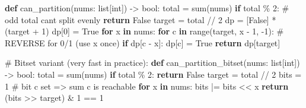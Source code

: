 \documentclass[11pt]{article}
\newenvironment{Shaded}{\begin{snugshade}}{\end{snugshade}}
\newcommand{\BuiltInTok}[1]{\textcolor[rgb]{0.50,0.55,0.55}{#1}}
\newcommand{\CommentTok}[1]{\textcolor[rgb]{0.48,0.49,0.49}{#1}}
\newcommand{\ControlFlowTok}[1]{\textcolor[rgb]{0.99,0.74,0.29}{\textbf{#1}}}
\newcommand{\DecValTok}[1]{\textcolor[rgb]{0.96,0.45,0.00}{#1}}
\newcommand{\KeywordTok}[1]{\textcolor[rgb]{0.81,0.81,0.76}{\textbf{#1}}}
\newcommand{\NormalTok}[1]{\textcolor[rgb]{0.81,0.81,0.76}{#1}}
\newcommand{\OperatorTok}[1]{\textcolor[rgb]{0.81,0.81,0.76}{#1}}
\newcommand{\VariableTok}[1]{\textcolor[rgb]{0.15,0.68,0.68}{#1}}
\begin{document}
\begin{Shaded}
\begin{Highlighting}[]
\KeywordTok{def}\NormalTok{ can\_partition(nums: }\BuiltInTok{list}\NormalTok{[}\BuiltInTok{int}\NormalTok{]) }\OperatorTok{{-}\textgreater{}} \BuiltInTok{bool}\NormalTok{:}
\NormalTok{    total }\OperatorTok{=} \BuiltInTok{sum}\NormalTok{(nums)}
    \ControlFlowTok{if}\NormalTok{ total }\OperatorTok{\%} \DecValTok{2}\NormalTok{:                 }\CommentTok{\# odd total can\textquotesingle{}t split evenly}
        \ControlFlowTok{return} \VariableTok{False}
\NormalTok{    target }\OperatorTok{=}\NormalTok{ total }\OperatorTok{//} \DecValTok{2}
\NormalTok{    dp }\OperatorTok{=}\NormalTok{ [}\VariableTok{False}\NormalTok{] }\OperatorTok{*}\NormalTok{ (target }\OperatorTok{+} \DecValTok{1}\NormalTok{)}
\NormalTok{    dp[}\DecValTok{0}\NormalTok{] }\OperatorTok{=} \VariableTok{True}
    \ControlFlowTok{for}\NormalTok{ x }\KeywordTok{in}\NormalTok{ nums:}
        \ControlFlowTok{for}\NormalTok{ c }\KeywordTok{in} \BuiltInTok{range}\NormalTok{(target, x }\OperatorTok{{-}} \DecValTok{1}\NormalTok{, }\OperatorTok{{-}}\DecValTok{1}\NormalTok{):   }\CommentTok{\# REVERSE for 0/1 (use x once)}
            \ControlFlowTok{if}\NormalTok{ dp[c }\OperatorTok{{-}}\NormalTok{ x]:}
\NormalTok{                dp[c] }\OperatorTok{=} \VariableTok{True}
    \ControlFlowTok{return}\NormalTok{ dp[target]}

\CommentTok{\# Bitset variant (very fast in practice):}
\KeywordTok{def}\NormalTok{ can\_partition\_bitset(nums: }\BuiltInTok{list}\NormalTok{[}\BuiltInTok{int}\NormalTok{]) }\OperatorTok{{-}\textgreater{}} \BuiltInTok{bool}\NormalTok{:}
\NormalTok{    total }\OperatorTok{=} \BuiltInTok{sum}\NormalTok{(nums)}
    \ControlFlowTok{if}\NormalTok{ total }\OperatorTok{\%} \DecValTok{2}\NormalTok{:}
        \ControlFlowTok{return} \VariableTok{False}
\NormalTok{    target }\OperatorTok{=}\NormalTok{ total }\OperatorTok{//} \DecValTok{2}
\NormalTok{    bits }\OperatorTok{=} \DecValTok{1}                      \CommentTok{\# bit c set =\textgreater{} sum c is reachable}
    \ControlFlowTok{for}\NormalTok{ x }\KeywordTok{in}\NormalTok{ nums:}
\NormalTok{        bits }\OperatorTok{|=}\NormalTok{ bits }\OperatorTok{\textless{}\textless{}}\NormalTok{ x}
    \ControlFlowTok{return}\NormalTok{ (bits }\OperatorTok{\textgreater{}\textgreater{}}\NormalTok{ target) }\OperatorTok{\&} \DecValTok{1} \OperatorTok{==} \DecValTok{1}
\end{Highlighting}
\end{Shaded}
\end{document}
